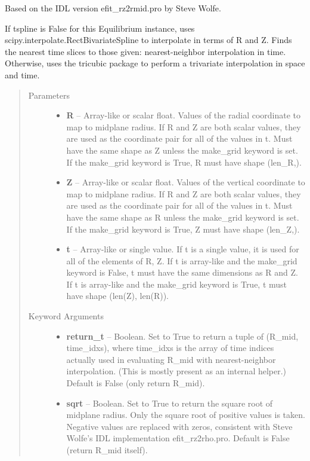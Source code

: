 \documentclass[letterpaper,10pt,english]{sphinxmanual}
\begin{document}
\begin{fulllineitems}
\begin{fulllineitems}
Based on the IDL version efit\_rz2rmid.pro by Steve Wolfe.

If tspline is False for this Equilibrium instance, uses
scipy.interpolate.RectBivariateSpline to interpolate in terms of R and
Z. Finds the nearest time slices to those given: nearest-neighbor
interpolation in time. Otherwise, uses the tricubic package to perform
a trivariate interpolation in space and time.
\begin{quote}\begin{description}
\item[{Parameters }] \leavevmode\begin{itemize}
\item {} 
\textbf{R} --
Array-like or scalar float.
Values of the radial coordinate to
map to midplane radius. If R and Z are both scalar values,
they are used as the coordinate pair for all of the values in t.
Must have the same shape as Z unless the make\_grid keyword is
set. If the make\_grid keyword is True, R must have shape (len\_R,).

\item {} 
\textbf{Z} --
Array-like or scalar float.
Values of the vertical coordinate to
map to midplane radius. If R and Z are both scalar values,
they are used as the coordinate pair for all of the values in t.
Must have the same shape as R unless the make\_grid keyword is
set. If the make\_grid keyword is True, Z must have shape (len\_Z,).

\item {} 
\textbf{t} --
Array-like or single value.
If t is a single value, it is used
for all of the elements of R, Z. If t is array-like and the
make\_grid keyword is False, t must have the same dimensions as
R and Z. If t is array-like and the make\_grid keyword is True,
t must have shape (len(Z), len(R)).

\end{itemize}

\item[{Keyword Arguments}] \leavevmode\begin{itemize}
\item {} 
\textbf{return\_t} --
Boolean.
Set to True to return a tuple of (R\_mid,
time\_idxs), where time\_idxs is the array of time indices
actually used in evaluating R\_mid with nearest-neighbor
interpolation. (This is mostly present as an internal helper.)
Default is False (only return R\_mid).

\item {} 
\textbf{sqrt} --
Boolean.
Set to True to return the square root of midplane
radius. Only the square root of positive values is taken.
Negative values are replaced with zeros, consistent with Steve
Wolfe's IDL implementation efit\_rz2rho.pro. Default is False
(return R\_mid itself).


\end{itemize}
\end{description}
\end{quote}
\end{fulllineitems}
\end{fulllineitems}
\end{document}
